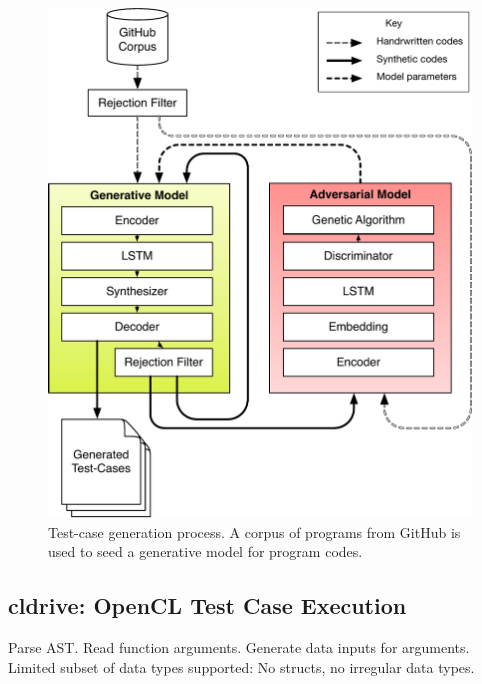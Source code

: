 \begin{figure}
        \centering
        \includegraphics[width=.95\columnwidth]{img/clgen} %
        \caption{%
                Test-case generation process. A corpus of programs from GitHub is used to seed a generative model for program codes.%
        }%
        \label{fig:deeptune}
\end{figure}

\subsection{cldrive: OpenCL Test Case Execution}

Parse AST. Read function arguments. Generate data inputs for arguments. Limited subset of data types supported: No structs, no irregular data types.










\printbibliography

